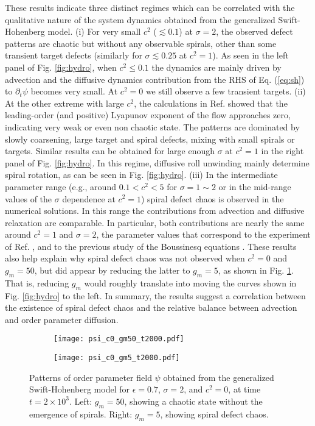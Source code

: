 \documentclass[preprint,prx,floatfix]{revtex4-1}
\begin{document}
These results indicate three distinct regimes which can be correlated with the qualitative nature of the system dynamics obtained from the generalized Swift-Hohenberg model. (i) For very small $c^2$ ($\lesssim 0.1$) at $\sigma = 2$, the observed defect patterns are chaotic but without any observable spirals, other than some transient target defects (similarly for $\sigma \lesssim 0.25$ at $c^2 = 1$). As seen in the left panel of Fig. \ref{fig:hydro}, when $c^2 \leq 0.1$ the dynamics are mainly driven by advection and the diffusive dynamics contribution from the RHS of Eq. (\ref{eq:sh}) to $\partial_t\psi$ becomes very small. At $c^2 = 0$ we still observe a few transient targets. (ii) At the other extreme with large $c^2$, the calculations in Ref. \cite{karimi2011exploring} showed that the leading-order (and positive) Lyapunov exponent of the flow approaches zero, indicating very weak or even non chaotic state. The patterns are dominated by slowly coarsening, large target and spiral defects, mixing with small spirals or targets. Similar results can be obtained for large enough $\sigma$ at $c^2 = 1$ in the right panel of Fig. \ref{fig:hydro}. In this regime, diffusive roll unwinding mainly determine spiral rotation, as can be seen in Fig. \ref{fig:hydro}. (iii) In the intermediate parameter range (e.g., around $0.1 < c^2 < 5$ for $\sigma  = 1 \sim 2$ or in the mid-range values of the $\sigma$ dependence at $c^2=1$) spiral defect chaos is observed in the numerical solutions. In this range the contributions from advection and diffusive relaxation are comparable. In particular, both contributions are nearly the same around $c^2 = 1$ and $\sigma = 2$, the parameter values that correspond to the experiment of Ref. \cite{morris1993spiral}, and to the previous study of the Boussinesq equations \cite{paul2003pattern,chiam:2003,re:decker94,karimi2011exploring}. These results also help explain why spiral defect chaos was not observed when $c^2 = 0$ and $g_m = 50$, but did appear by reducing the latter to $g_m = 5$, as shown in Fig. \ref{fig:c0}. That is, reducing $g_m$ would roughly translate into moving the curves shown in Fig. \ref{fig:hydro} to the left. In summary, the results suggest a correlation between the existence of spiral defect chaos and the relative balance between advection and order parameter diffusion.

\begin{figure}[ht]
    \begin{subfigure}{0.45\textwidth}
        \centering
        \texttt{[image: psi\_c0\_gm50\_t2000.pdf]}
    \end{subfigure}
    \begin{subfigure}{0.45\textwidth}
        \centering
        \texttt{[image: psi\_c0\_gm5\_t2000.pdf]}
    \end{subfigure}
    \caption{Patterns of order parameter field $\psi$ obtained from the generalized Swift-Hohenberg model for $\epsilon= 0.7$, $\sigma = 2$, and $c^2 = 0$, at time $t = 2 \times 10^3$. Left: $g_m = 50$, showing a chaotic state without the emergence of spirals. Right: $g_m = 5$, showing spiral defect chaos.}
    \label{fig:c0}
\end{figure}
\end{document}
